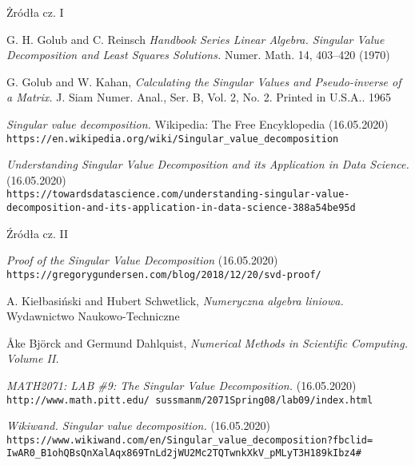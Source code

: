\documentclass{beamer}
\begin{document}
\begin{frame}{Żródła cz. I}
\fontsize{8pt}{6}\selectfont

    \begin{thebibliography}{9}
G. H. Golub and C. Reinsch \textit{Handbook Series Linear Algebra. Singular Value Decomposition and Least Squares Solutions.} Numer. Math. 14, 403--420 (1970)

G. Golub and W. Kahan, \textit{Calculating the Singular Values and Pseudo-inverse of a Matrix.} J. Siam Numer. Anal., Ser. B, Vol. 2, No. 2. Printed in U.S.A.. 1965

\textit{Singular value decomposition.} Wikipedia: The Free Encyklopedia (16.05.2020)
\\\texttt{https://en.wikipedia.org/wiki/Singular\_value\_decomposition} 


\textit{Understanding Singular Value Decomposition and its Application in Data Science.} (16.05.2020)
\\\texttt{https://towardsdatascience.com/understanding-singular-value-\\decomposition-and-its-application-in-data-science-388a54be95d} 

\end{thebibliography}
\end{frame}
\begin{frame}{Źródła cz. II}
\fontsize{8pt}{7.2}\selectfont

    \begin{thebibliography}{9}
\textit{Proof of the Singular Value Decomposition} (16.05.2020)
\\\texttt{https://gregorygundersen.com/blog/2018/12/20/svd-proof/}

A. Kiełbasiński and Hubert Schwetlick, \textit{Numeryczna algebra liniowa.} Wydawnictwo Naukowo-Techniczne

Åke Björck and Germund Dahlquist, \textit{Numerical Methods in Scientific Computing. Volume II.}

\textit{MATH2071: LAB \#9: The Singular Value Decomposition.} (16.05.2020)
\\\texttt{http://www.math.pitt.edu/~sussmanm/2071Spring08/lab09/index.html}

\textit{Wikiwand. Singular value decomposition.} (16.05.2020)
\\\texttt{https://www.wikiwand.com/en/Singular\_value\_decomposition?fbclid=\\IwAR0\_B1ohQBsQnXalAqx869TnLd2jWU2Mc2TQTwnkXkV\_pMLyT3H189kIbz4\#}
\end{thebibliography}
\end{frame}
\end{document}
